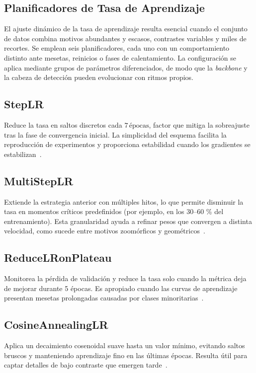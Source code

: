 \subsection{Planificadores de Tasa de Aprendizaje}

El ajuste dinámico de la tasa de aprendizaje resulta esencial cuando el conjunto de datos combina motivos abundantes y escasos, contrastes variables y miles de recortes.
Se emplean seis planificadores, cada uno con un comportamiento distinto ante mesetas, reinicios o fases de calentamiento.
La configuración se aplica mediante grupos de parámetros diferenciados, de modo que la \emph{backbone} y la cabeza de detección pueden evolucionar con ritmos propios.

\subsection*{StepLR}
Reduce la tasa en saltos discretos cada \(7\,\text{épocas}\), factor que mitiga la sobreajuste tras la fase de convergencia inicial.
La simplicidad del esquema facilita la reproducción de experimentos y proporciona estabilidad cuando los gradientes se estabilizan~\cite{goyal2017}.

\subsection*{MultiStepLR}
Extiende la estrategia anterior con múltiples hitos, lo que permite disminuir la tasa en momentos críticos predefinidos (por ejemplo, en los \(30\text{–}60\) \% del entrenamiento).
Esta granularidad ayuda a refinar pesos que convergen a distinta velocidad, como sucede entre motivos zoomórficos y geométricos~\cite{he2016}.

\subsection*{ReduceLRonPlateau}
Monitorea la pérdida de validación y reduce la tasa solo cuando la métrica deja de mejorar durante 5 épocas.
Es apropiado cuando las curvas de aprendizaje presentan mesetas prolongadas causadas por clases minoritarias~\cite{hinton2012}.

\subsection*{CosineAnnealingLR}
Aplica un decaimiento cosenoidal suave hasta un valor mínimo, evitando saltos bruscos y manteniendo aprendizaje fino en las últimas épocas.
Resulta útil para captar detalles de bajo contraste que emergen tarde~\cite{loshchilov2017}.

